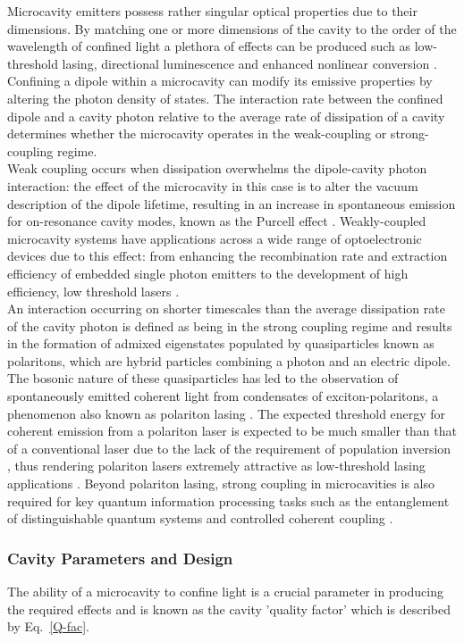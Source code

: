 Microcavity emitters possess rather singular optical properties due to their dimensions. By matching one or more dimensions of the cavity to the order of the wavelength of confined light a plethora of effects can be produced such as low-threshold lasing, directional luminescence and enhanced nonlinear conversion \cite{Christopoulos2007}. Confining a dipole within a microcavity can modify its emissive properties by altering the photon density of states. The interaction rate between the confined dipole and a cavity photon relative to the average rate of dissipation of a cavity determines whether the microcavity operates in the weak-coupling or strong-coupling regime.\\Weak coupling occurs when dissipation overwhelms the dipole-cavity photon interaction: the effect of the microcavity in this case is to alter the vacuum description of the dipole lifetime, resulting in an increase in spontaneous emission for on-resonance cavity modes, known as the Purcell effect \cite{Vahala2003}. Weakly-coupled microcavity systems have applications across a wide range of optoelectronic devices due to this effect: from enhancing the recombination rate and extraction efficiency of embedded single photon emitters \cite{Jarjour2007a} to the development of high efficiency, low threshold lasers \cite{Aharonovich2013}.\\An interaction occurring on shorter timescales than the average dissipation rate of the cavity photon is defined as being in the strong coupling regime and results in the formation of admixed eigenstates populated by quasiparticles known as polaritons, which are hybrid particles combining a photon and an electric dipole. The bosonic nature of these quasiparticles has led to the observation of spontaneously emitted coherent light from condensates of exciton-polaritons,  a phenomenon also known as polariton lasing \cite{Malpuech2002}. The expected threshold energy for coherent emission from a polariton laser is expected to be much smaller than that of a conventional laser due to the lack of the requirement of population inversion , thus rendering polariton lasers extremely attractive as low-threshold lasing applications \cite{Christopoulos2007}. Beyond polariton lasing, strong coupling in microcavities is also required for key quantum information processing tasks such as the entanglement of distinguishable quantum systems and controlled coherent coupling \cite{Imamoglu1999,Hennessy2007}.

\subsubsection{Cavity Parameters and Design}
The ability of a microcavity to confine light is a crucial parameter in producing the required effects and is known as the cavity 'quality factor' which is described by Eq.~\ref{Q-fac}.

